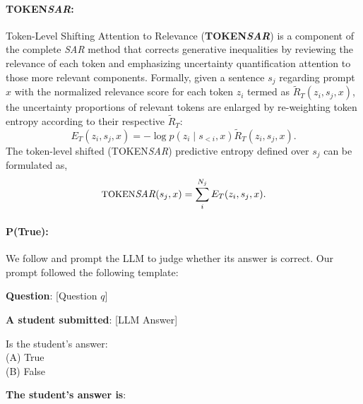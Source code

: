 \documentclass[11pt]{article}
\begin{document}
\paragraph{{\small TOKEN}\textit{SAR}: }
Token-Level Shifting Attention to Relevance (\textbf{{\small TOKEN}\textit{SAR}}) is a component of the complete \textit{SAR} method \citep{duan2024shifting} that corrects generative inequalities by reviewing the relevance of each token and emphasizing uncertainty quantification attention to those more relevant components. Formally, given a sentence $s_j$ regarding prompt $x$ with the normalized relevance score for each token $z_i$ termed as $\tilde{R}_T(z_i, s_j, x)$,  the uncertainty proportions of relevant tokens are enlarged by re-weighting token entropy according to their respective $\tilde{R}_T$:
\begin{equation}
    E_T(z_i, s_j, x) = -\log p(z_i \mid s_{<i}, x) \tilde{R}_T(z_i, s_j, x).
\end{equation}
The token-level shifted ({\small TOKEN}\textit{SAR}) predictive entropy defined over $s_j$ can be formulated as,
\begin{equation}
    \text{{\small TOKEN}\textit{SAR}}(s_j, x) = \sum_{i}^{N_j} E_T(z_i, s_j, x).
\end{equation}


\paragraph{P(True): } 
We follow \citet{kadavath2022language} and prompt the LLM to judge whether its answer is correct. Our prompt followed the following template:


\begin{tcolorbox}[
    colframe=black,  %
    colback=white,   %
    rounded corners=north, %
    arc=1mm, %
    boxrule=.4mm, %
    width=\linewidth, %
    coltitle=black, 
    colbacktitle=white,
    title={\textbf{P(True)}}, %
    fonttitle=\bfseries, %
]

\textbf{Question}: [Question $q$]

\textbf{A student submitted}: [LLM Answer]

\vspace{5pt}

Is the student’s answer:\\
(A) True\\
(B) False

\vspace{5pt}

\textbf{The student's answer is}: 

\end{tcolorbox}
\end{document}
